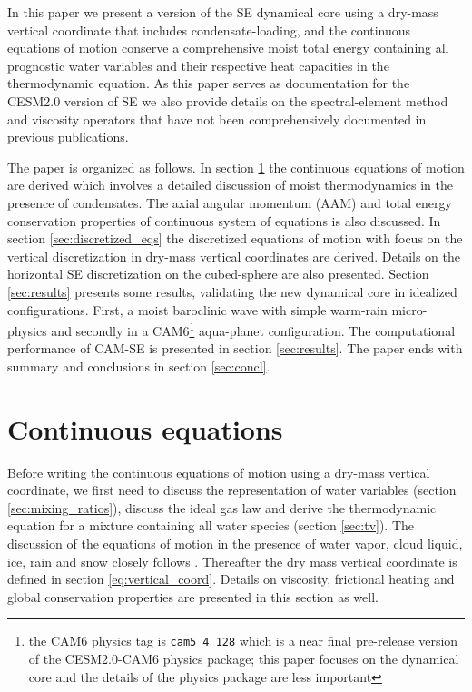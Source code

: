 \documentclass{agujournal}
\begin{document}
{In this paper we present a version of the SE dynamical core using a dry-mass vertical coordinate that includes condensate-loading, and the continuous equations of motion conserve a comprehensive moist total energy containing all prognostic water variables and their respective heat capacities in the thermodynamic equation. As this paper serves as documentation for the CESM2.0 version of SE we also provide details on the spectral-element method and viscosity operators that have not been comprehensively documented in previous publications. 

The paper is organized as follows. In section \ref{sec:cont-eq} the continuous equations of motion are derived which involves a detailed discussion of moist thermodynamics in the presence of condensates. The axial angular momentum (AAM) and total energy conservation properties of continuous system of equations is also discussed. In section \ref{sec:discretized_eqs} the discretized equations of motion with focus on the vertical discretization in dry-mass vertical coordinates are derived. Details on the horizontal SE discretization on the cubed-sphere are also presented. Section \ref{sec:results} presents some results, validating the new dynamical core in idealized configurations. First, a moist baroclinic wave with simple warm-rain micro-physics and secondly in a CAM6{\footnote{the CAM6 physics tag is {\tt{cam5\_4\_128}} which is a near final pre-release version of the CESM2.0-CAM6 physics package; this paper focuses on the dynamical core and the details of the physics package are less important}} aqua-planet configuration. The computational performance of CAM-SE is presented in section \ref{sec:results}. The paper ends with summary and conclusions in section \ref{sec:concl}.
%
\section{Continuous equations}\label{sec:cont-eq}
Before writing the continuous equations of motion using a dry-mass vertical coordinate, we first need to discuss the representation of water variables (section \ref{sec:mixing_ratios}), discuss the ideal gas law and derive the thermodynamic equation for a mixture containing all water species (section \ref{sec:tv}). The discussion of the equations of motion in the presence of water vapor, cloud liquid, ice, rain and snow closely follows \citet{joyOfUM}. Thereafter the dry mass vertical coordinate is defined in section \ref{eq:vertical_coord}. Details on viscosity, frictional heating and global conservation properties are presented in this section as well.
}
\end{document}
